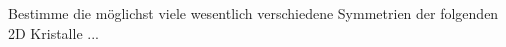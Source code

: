 \begin{sheet}

\begin{problem}
Bestimme die möglichst viele wesentlich verschiedene Symmetrien der folgenden 2D Kristalle ...
\end{problem}

\end{sheet}